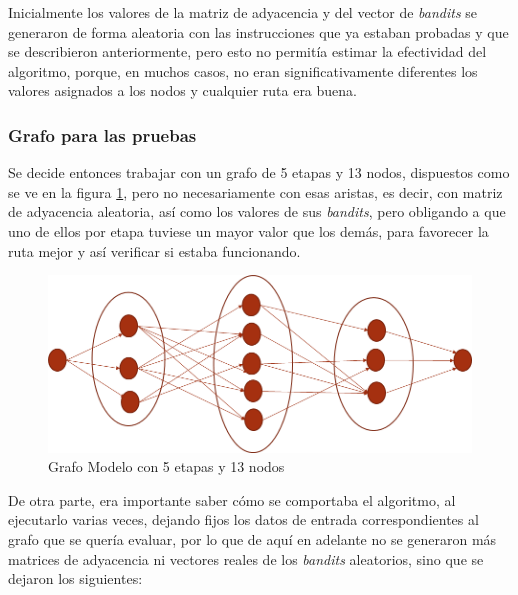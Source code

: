 Inicialmente los valores de la matriz de adyacencia y del vector de \textit{bandits} se generaron de forma aleatoria con las instrucciones que ya estaban probadas y que se describieron anteriormente, pero esto no permitía estimar la efectividad del algoritmo, porque, en muchos casos, no eran significativamente diferentes los valores asignados a los nodos y cualquier ruta era buena. 

\subsubsection{Grafo para las pruebas}

Se decide entonces trabajar con un grafo de 5 etapas y 13 nodos, dispuestos como se ve en la figura \ref{Grafomodelo}, pero no necesariamente con esas aristas, es decir, con matriz de adyacencia aleatoria, así como los valores de sus \textit{bandits}, pero obligando a que uno de ellos por etapa tuviese un mayor valor que los demás, para favorecer la ruta mejor y así verificar si estaba funcionando.

\begin{figure}[h]
  \centering
    \includegraphics[scale=0.5]{GrafoModelo.png}
  \caption[Grafo Modelo]{Grafo Modelo con 5 etapas y 13 nodos}
  \label{Grafomodelo}
\end{figure}

De otra parte, era importante saber cómo se comportaba el algoritmo, al ejecutarlo varias veces, dejando fijos los datos de entrada correspondientes al grafo que se quería evaluar, por lo que de aquí en adelante no se generaron más matrices de adyacencia ni vectores reales de los \textit{bandits} aleatorios, sino que se dejaron los siguientes:

